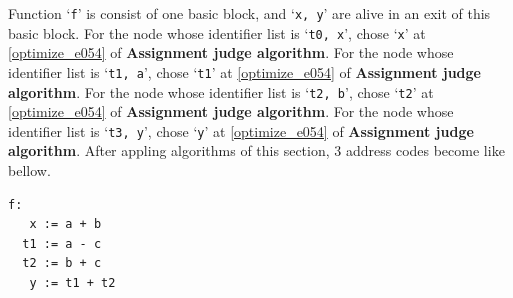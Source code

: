 \begin{Example}
\begin{figure}[htbp]
\end{figure}
Function `{\tt{f}}' is consist of one basic block, and 
`{\tt{x, y}}' are alive in an exit of this basic block.
For the node whose identifier list is `{\tt{t0, x}}',
chose `{\tt{x}}' at \ref{optimize_e054} of {\bf Assignment judge algorithm}.
For the node whose identifier list is `{\tt{t1, a}}',
chose `{\tt{t1}}' at \ref{optimize_e054} of {\bf Assignment judge algorithm}.
For the node whose identifier list is `{\tt{t2, b}}',
chose `{\tt{t2}}' at \ref{optimize_e054} of {\bf Assignment judge algorithm}.
For the node whose identifier list is `{\tt{t3, y}}',
chose `{\tt{y}}' at \ref{optimize_e054} of {\bf Assignment judge algorithm}.
After appling algorithms of this section,
3 address codes become like bellow.
\begin{verbatim}
f:
   x := a + b
  t1 := a - c
  t2 := b + c
   y := t1 + t2
\end{verbatim}
\end{Example}

